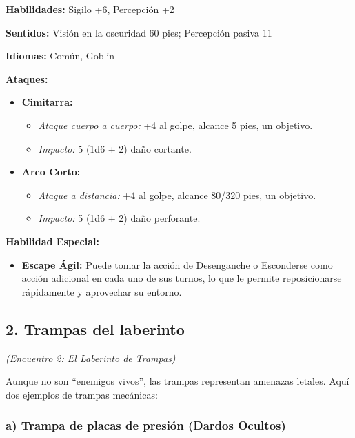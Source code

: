 \documentclass[
  twocolumn]{article}
\providecommand{\tightlist}{%
  \setlength{\itemsep}{0pt}\setlength{\parskip}{0pt}}
\begin{document}
\textbf{Habilidades:} Sigilo +6, Percepción +2

\textbf{Sentidos:} Visión en la oscuridad 60 pies; Percepción pasiva 11

\textbf{Idiomas:} Común, Goblin

\textbf{Ataques:}

\begin{itemize}
\tightlist
\item
  \textbf{Cimitarra:}

  \begin{itemize}
  \tightlist
  \item
    \emph{Ataque cuerpo a cuerpo:} +4 al golpe, alcance 5 pies, un
    objetivo.
  \item
    \emph{Impacto:} 5 (1d6 + 2) daño cortante.
  \end{itemize}
\item
  \textbf{Arco Corto:}

  \begin{itemize}
  \tightlist
  \item
    \emph{Ataque a distancia:} +4 al golpe, alcance 80/320 pies, un
    objetivo.
  \item
    \emph{Impacto:} 5 (1d6 + 2) daño perforante.
  \end{itemize}
\end{itemize}

\textbf{Habilidad Especial:}

\begin{itemize}
\tightlist
\item
  \textbf{Escape Ágil:} Puede tomar la acción de Desenganche o
  Esconderse como acción adicional en cada uno de sus turnos, lo que le
  permite reposicionarse rápidamente y aprovechar su entorno.
\end{itemize}

\subsection{2. Trampas del laberinto}\label{trampas-del-laberinto}

\emph{(Encuentro 2: El Laberinto de Trampas)}

Aunque no son ``enemigos vivos'', las trampas representan amenazas
letales. Aquí dos ejemplos de trampas mecánicas:

\subsubsection{a) Trampa de placas de presión (Dardos
Ocultos)}\label{a-trampa-de-placas-de-presiuxf3n-dardos-ocultos}
\end{document}

